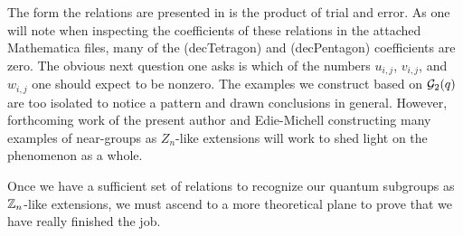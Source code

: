 The form the relations are presented in is the product of trial and error. 
As one will note when inspecting the coefficients of these relations in the attached Mathematica files,
many of the (decTetragon) and (decPentagon) coefficients are zero.
The obvious next question one asks is which of the numbers $u_{i,j}$, $v_{i,j}$, and $w_{i,j}$ one should expect to be nonzero.
The examples we construct based on $\mathcal{G}_2(q)$ are too isolated to notice a pattern and drawn conclusions in general.
However, forthcoming work of the present author and Edie-Michell \cite{cain_me_near_groups} 
constructing many examples of near-groups as $Z_n$-like extensions will work to shed light on the phenomenon as a whole.

Once we have a sufficient set of relations to recognize our quantum subgroups as $\mathbb{Z}_n$-like extensions,
we must ascend to a more theoretical plane to prove that we have really finished the job.